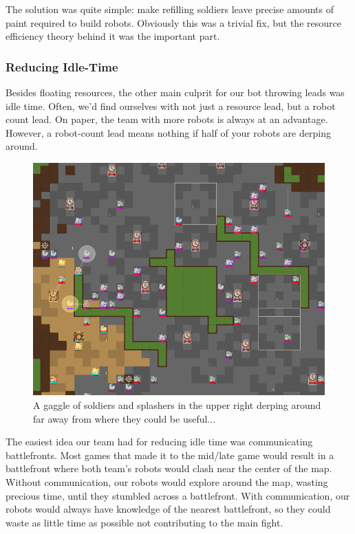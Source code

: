 \medskip

The solution was quite simple: make refilling soldiers leave precise amounts of paint required to build robots. Obviously this was a trivial fix, but the resource efficiency theory behind it was the important part.

\subsubsection{Reducing Idle-Time}

Besides floating resources, the other main culprit for our bot throwing leads was idle time. Often, we'd find ourselves with not just a resource lead, but a robot count lead. On paper, the team with more robots is always at an advantage. However, a robot-count lead means nothing if half of your robots are derping around.

\begin{figure}[h]
    \centering
    \includegraphics[scale=0.5]{images/idle_time.png}
    \caption{A gaggle of soldiers and splashers in the upper right derping around far away from where they could be useful...}
\end{figure}

The easiest idea our team had for reducing idle time was communicating battlefronts. Most games that made it to the mid/late game would result in a battlefront where both team's robots would clash near the center of the map. Without communication, our robots would explore around the map, wasting precious time, until they stumbled across a battlefront. With communication, our robots would always have knowledge of the nearest battlefront, so they could waste as little time as possible not contributing to the main fight.

